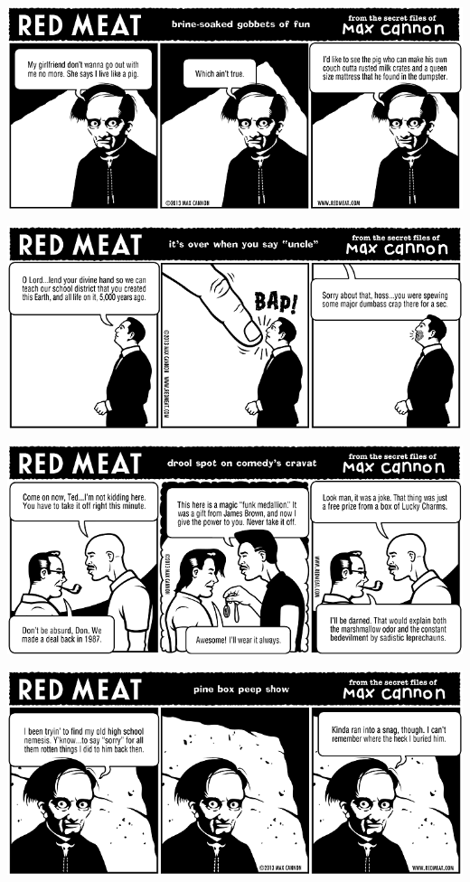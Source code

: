 \documentclass[a4paper,twoside,11pt]{article}
\begin{document}
\includegraphics[width=\textwidth]{redmeat_2013-03-05.png}



\includegraphics[width=\textwidth]{redmeat_2013-03-12.png}



\includegraphics[width=\textwidth]{redmeat_2013-03-19.png}



\includegraphics[width=\textwidth]{redmeat_2013-03-26.png}
\end{document}
